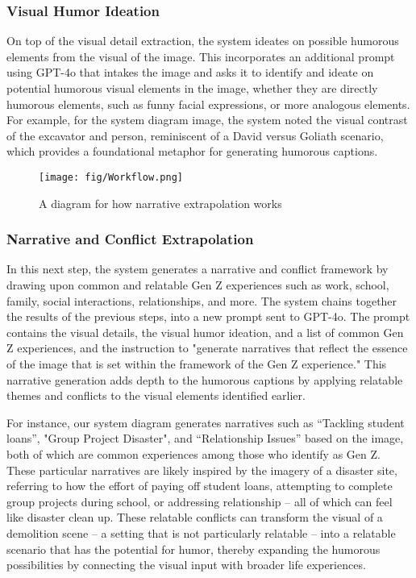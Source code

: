 \subsubsection{Visual Humor Ideation}

On top of the visual detail extraction, the system ideates on possible humorous elements from the visual of the image. This incorporates an additional prompt using GPT-4o that intakes the image and asks it to identify and ideate on potential humorous visual elements in the image, whether they are directly humorous elements, such as funny facial expressions, or more analogous elements. For example, for the system diagram image, the system noted the visual contrast of the excavator and person, reminiscent of a David versus Goliath scenario, which provides a foundational metaphor for generating humorous captions. 

\begin{figure*}[b]
    \centering
    \texttt{[image: fig/Workflow.png]}
    \caption{A diagram for how narrative extrapolation works}
    \label{fig:systemLines}
\end{figure*}

\subsubsection{Narrative and Conflict Extrapolation}

In this next step, the system generates a narrative and conflict framework by drawing upon common and relatable Gen Z experiences such as work, school, family, social interactions, relationships, and more. 
The system chains together the results of the previous steps, into a new prompt sent to GPT-4o. 
The prompt contains the visual details, the visual humor ideation, and a list of common Gen Z experiences,  and the instruction to "generate narratives that reflect the essence of the image that is set within the framework of the Gen Z experience."
This narrative generation adds depth to the humorous captions by applying relatable themes and conflicts to the visual elements identified earlier.

For instance, our system diagram generates narratives such as “Tackling student loans”, "Group Project Disaster", and “Relationship Issues” based on the image, both of which are common experiences among those who identify as Gen Z. These particular narratives are likely inspired by the imagery of a disaster site, referring to how the effort of paying off student loans, attempting to complete group projects during school, or addressing relationship -- all of which can feel like disaster clean up. These relatable conflicts can transform the visual of a demolition scene -- a setting that is not particularly relatable -- into a relatable scenario that has the potential for humor, thereby expanding the humorous possibilities by connecting the visual input with broader life experiences.




